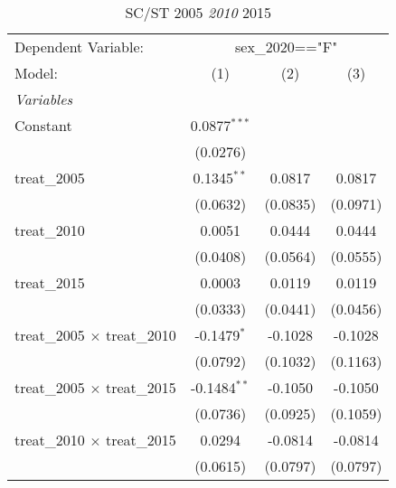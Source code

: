 
\begin{table}[htbp]
   \caption{SC/ST 2005 \textit{ 2010 } 2015}
   \centering
   \begin{tabular}{lccc}
      \tabularnewline \midrule \midrule
      Dependent Variable: & \multicolumn{3}{c}{sex\_2020=="F"}\\
      Model:                                                     & (1)            & (2)      & (3)\\  
      \midrule
      \emph{Variables}\\
      Constant                                                   & 0.0877$^{***}$ &          &   \\   
                                                                 & (0.0276)       &          &   \\   
      treat\_2005                                                & 0.1345$^{**}$  & 0.0817   & 0.0817\\   
                                                                 & (0.0632)       & (0.0835) & (0.0971)\\   
      treat\_2010                                                & 0.0051         & 0.0444   & 0.0444\\   
                                                                 & (0.0408)       & (0.0564) & (0.0555)\\   
      treat\_2015                                                & 0.0003         & 0.0119   & 0.0119\\   
                                                                 & (0.0333)       & (0.0441) & (0.0456)\\   
      treat\_2005 $\times$ treat\_2010                           & -0.1479$^{*}$  & -0.1028  & -0.1028\\   
                                                                 & (0.0792)       & (0.1032) & (0.1163)\\   
      treat\_2005 $\times$ treat\_2015                           & -0.1484$^{**}$ & -0.1050  & -0.1050\\   
                                                                 & (0.0736)       & (0.0925) & (0.1059)\\   
      treat\_2010 $\times$ treat\_2015                           & 0.0294         & -0.0814  & -0.0814\\   
                                                                 & (0.0615)       & (0.0797) & (0.0797)\\   

\end{tabular}
\end{table}
